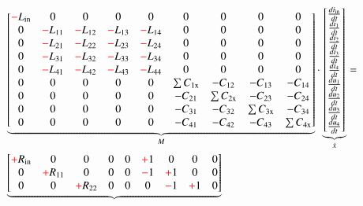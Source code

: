 \begin{refsection}
{\footnotesize 
\begin{align}
			&
			\underbrace{\begin{bmatrix}
			\color{red}-\color{black}L_\mathrm{in}&0&0&0&0 & 0&0&0&0 \\
			0&\color{red}-\color{black}L_{11}&\color{red}-\color{black}L_{12}&\color{red}-\color{black}L_{13}&\color{red}-\color{black}L_{14} & 0&0&0&0 \\
			0&\color{red}-\color{black}L_{21}&\color{red}-\color{black}L_{22}&\color{red}-\color{black}L_{23}&\color{red}-\color{black}L_{24} & 0&0&0&0 \\
			0&\color{red}-\color{black}L_{31}&\color{red}-\color{black}L_{32}&\color{red}-\color{black}L_{33}&\color{red}-\color{black}L_{34} & 0&0&0&0 \\
			0&\color{red}-\color{black}L_{41}&\color{red}-\color{black}L_{42}&\color{red}-\color{black}L_{43}&\color{red}-\color{black}L_{44} & 0&0&0&0 \\
			0&0&0&0&0 & \sum{C_{1\mathrm{x}}}&-C_{12}&-C_{13}&-C_{14} \\
			0&0&0&0&0 & -C_{21}&\sum{C_{2\mathrm{x}}}&-C_{23}&-C_{24} \\
			0&0&0&0&0 & -C_{31}&-C_{32}&\sum{C_{3\mathrm{x}}}&-C_{34} \\
			0&0&0&0&0 & -C_{41}&-C_{42}&-C_{43}&\sum{C_{4\mathrm{x}}}
			    \end{bmatrix}}_{\text{$M$}}
			\cdot
			\underbrace{\begin{bmatrix}
			\frac{di_\mathrm{in}}{dt} \\
			\frac{di_1}{dt} \\
			\frac{di_2}{dt} \\
			\frac{di_3}{dt} \\
			\frac{di_4}{dt} \\
			\frac{du_1}{dt} \\
			\frac{du_2}{dt} \\
			\frac{du_3}{dt} \\
			\frac{du_4}{dt}
			\end{bmatrix}}_{\text{$\dot{x}$}}
			= \nonumber \\
			&
			\underbrace{\begin{bmatrix}
			\color{red}+\color{black}R_\mathrm{in}&0&0&0&0 & \color{red}+\color{black}1&0&0&0 \\
			0&\color{red}+\color{black}R_{11}&0&0&0 & \color{red}-\color{black}1&\color{red}+\color{black}1&0&0 \\
			0&0&\color{red}+\color{black}R_{22}&0&0 & 0&\color{red}-\color{black}1&\color{red}+\color{black}1&0 \\

\end{bmatrix}}
\end{align}}
\end{refsection}
